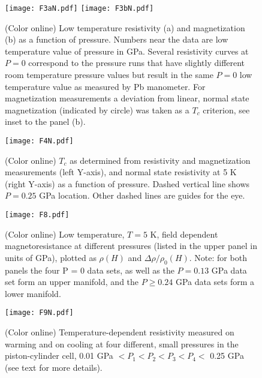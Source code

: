 \documentclass[aps,prb,preprint,groupedaddress,showpacs,amsmath,amssymb]{revtex4}
\begin{document}
\clearpage

\begin{figure}
\begin{center}
\texttt{[image: F3aN.pdf]}
\texttt{[image: F3bN.pdf]}
\end{center}
\caption{(Color online) Low temperature resistivity (a) and magnetization (b) as a function of pressure. Numbers near the data are low temperature value of pressure in GPa. Several resistivity curves at $P = 0$ correspond to the pressure runs that have slightly different room temperature pressure values but result in the same $P = 0$ low temperature value as measured by Pb manometer. For magnetization measurements a deviation from linear, normal state magnetization (indicated by circle) was taken as a $T_c$ criterion, see inset to the panel (b). } \label{F3}
\end{figure}

\clearpage

\begin{figure}
\begin{center}
\texttt{[image: F4N.pdf]}
\end{center}
\caption{(Color online) $T_c$  as determined from resistivity and magnetization measurements (left Y-axis), and normal state resistivity at 5 K (right Y-axis) as a function of pressure. Dashed vertical line shows $P = 0.25$ GPa location. Other dashed lines are guides for the eye.} \label{F4}
\end{figure}


\clearpage

\begin{figure}
\begin{center}
\texttt{[image: F8.pdf]}
\end{center}
\caption{(Color online) Low temperature, $T = 5$ K, field dependent magnetoresistance at different pressures (listed in the upper panel in units of GPa), plotted as  $\rho(H)$ and $\Delta \rho/\rho_0(H)$. Note: for both panels the four P = 0 data sets, as well as the $P = 0.13$ GPa data set form an upper manifold, and the $P \geq 0.24$ GPa data sets form a lower manifold.} \label{F7}
\end{figure}

\clearpage

\begin{figure}
\begin{center}
\texttt{[image: F9N.pdf]}
\end{center}
\caption{(Color online) Temperature-dependent resistivity measured on warming and on cooling at four different, small pressures in the piston-cylinder cell, 0.01 GPa $<  P_1 < P_2 < P_3 < P_4 <$ 0.25 GPa (see text for more details).} \label{F9}
\end{figure}
\end{document}
